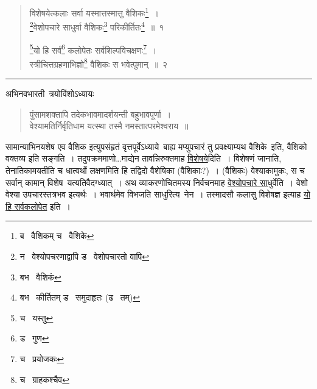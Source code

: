 \documentclass[11pt, openany]{book}
\begin{document}
\begin{quote}
{\na विशेषयेत्कलाः सर्वा यस्मात्तस्मात्तु वैशिकः\renewcommand{\thefootnote}{2}\footnote{ब \textendash\  वैशिकम् च \textendash\  वैशिके}~।\\
\renewcommand{\thefootnote}{3}\footnote{न \textendash\  वेश्योपचरणाद्वापि ड \textendash\  वेशोपचारतो वापि}वेशोपचारे साधुर्वा वैशिकः\renewcommand{\thefootnote}{4}\footnote{बभ \textendash\  वैशिकं} परिकीर्तितः\renewcommand{\thefootnote}{5}\footnote{बभ \textendash\  कीर्तितम् ड \textendash\  समुदाहृतः (ढ \textendash\  तम्)}~॥~१

\renewcommand{\thefootnote}{6}\footnote{च \textendash\  यस्तु}यो हि सर्व\renewcommand{\thefootnote}{7}\footnote{ड \textendash\  गुण} कलोपेतः सर्वशिल्पविचक्षणः\renewcommand{\thefootnote}{8}\footnote{च \textendash\  प्रयोजकः}~।\\
स्त्रीचित्तग्रहणाभिज्ञो\renewcommand{\thefootnote}{9}\footnote{च \textendash\  ग्राहकश्चैव} वैशिकः स भवेत्पुमान्~॥~२}
\end{quote}

\hrule

\begin{center}
अभिनवभारती\textendash\ त्रयोविंशोऽध्यायः
\end{center}

\begin{quote}
{\qt पुंसामशक्तापि तदेकभावमादर्शयन्ती बहुभावपूर्णा~।\\
वेश्यामतिर्निर्वृतिधाम यत्स्था तस्मै नमस्तात्परमेश्वराय~॥}
\end{quote}

सामान्याभिनयशेष एव वैशिक इत्युपसंहृतं वृत्तपूर्वेऽध्याये\textendash\ बाह्य मप्युपचारं तु प्रवक्ष्याम्यथ वैशिके\textendash\ इति, वैशिको वक्तव्य इति सङ्गति~। तदुपक्रममाणो\ldots माद्येन तावन्निरुक्तमाह \underline{विशेषये}दिति~। विशेषणं जानाति, तेनातिकामयतीति च धात्वर्थो लक्षणमिति हि तद्विदो वैशेषिका (वैशिकाः?)~। (वैशिकः) वेश्याकामुकः, स च सर्वान् कामान् विशेष\textendash\ यत्यतिवैदग्ध्यात्~। अथ व्याकरणोचितमस्य निर्वचनमाह \underline{वेश्योपचारे साधु}र्वेति~। वेशो वेश्या उपचारस्तत्रभव इत्यर्थः~। भवार्थमेव विभजति साधुरित्य\textendash\ नेन~। तस्मादसौ कलासु विशेषज्ञ इत्याह \underline{यो हि सर्वकलोपेत} इति~।

\newpage
{}
\end{document}
